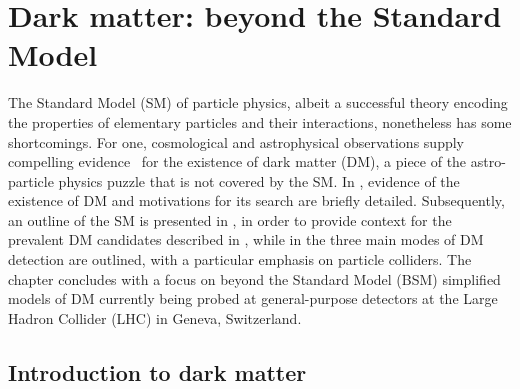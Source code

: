 \chapter{Dark matter: beyond the Standard Model}
\label{chap:DM}

The Standard Model (SM) of particle physics, albeit a successful theory encoding the properties of elementary particles and their interactions, nonetheless has some shortcomings. For one, cosmological and astrophysical observations supply compelling evidence~\cite{Bertone:2004pz, Feng:2010gw, Porter:2011nv} for the existence of dark matter (DM), a piece of the astro-particle physics puzzle that is not covered by the SM. In , evidence of the existence of DM and motivations for its search are briefly detailed. Subsequently, an outline of the SM is presented in , in order to provide context for the prevalent DM candidates described in , while in  the three main modes of DM detection are outlined, with a particular emphasis on particle colliders. The chapter concludes with a focus on beyond the Standard Model (BSM) simplified models of DM currently being probed at general-purpose detectors at the Large Hadron Collider (LHC) in Geneva, Switzerland.

\section{Introduction to dark matter}
\label{sec:DMintro}

